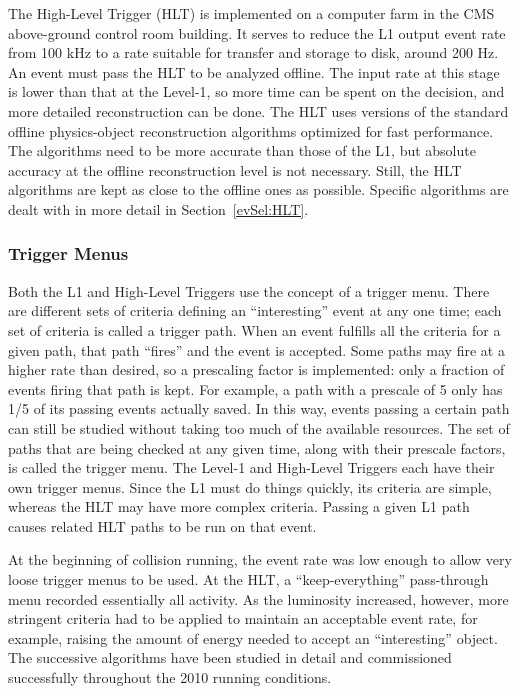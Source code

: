 The High-Level Trigger (HLT) \cite{hlt-0512077} 
is implemented on a computer farm in the 
CMS above-ground control room building.  
It serves to reduce the L1 output event rate from 
100 kHz to a rate suitable 
for transfer and storage to disk, around 200 Hz.  
An event must pass the HLT to be analyzed offline.  
The input rate at this stage is lower than that at the Level-1, 
so more time can be 
spent %
on the decision, 
and more detailed reconstruction can be done.  
The HLT uses versions of the standard offline physics-object reconstruction algorithms 
optimized for fast performance.  
The algorithms need to be more accurate than those of the L1, 
but absolute accuracy at the offline reconstruction level is not necessary.  
Still, the HLT algorithms are kept as close to the offline ones as possible.  
Specific algorithms are dealt with in more detail in 
Section~\ref{evSel:HLT}.  

\subsubsection{Trigger Menus}
\label{exp:trigMenus}
Both the L1 and High-Level Triggers use the concept of a trigger menu.  
There are different sets of criteria defining an ``interesting'' event 
at any one time;  
each set of criteria is called a trigger path.  
When an event fulfills all the criteria for a given path, 
that path ``fires'' and the event is accepted.  
Some paths may fire at a higher rate than desired, 
so a prescaling factor is implemented: 
only a fraction of events firing that path is kept.  
For example, a path with a prescale of 5 only 
has 1/5 of its passing events actually saved.  
In this way, events passing a certain path can still 
be studied without taking too much of the available resources.  
The set of paths that are being checked at any given time,
along with their prescale factors,  
is called the trigger menu.  
The Level-1 and High-Level Triggers each have their own 
trigger menus.  
Since the L1 must do things quickly, 
its criteria are simple, 
whereas the HLT may have more complex criteria.  
Passing a given L1 path causes 
related HLT paths to be run on that event.  

At the beginning of collision running, 
the event rate was low enough to allow very loose trigger 
menus to be used.  
At the HLT, a ``keep-everything'' pass-through menu 
recorded essentially all activity.  
As the luminosity increased, however, more stringent criteria had 
to be applied to maintain an acceptable event rate, 
for example, raising the amount of energy needed to accept an 
``interesting'' object.  
The successive algorithms have been studied in detail and 
commissioned successfully throughout the 2010 running conditions.  

